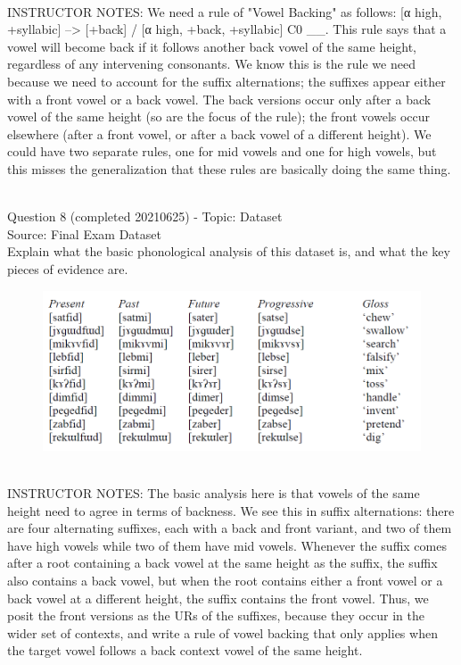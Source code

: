 \documentclass[12pt]{article}
\begin{document}
~\\
INSTRUCTOR NOTES: We need a rule of "Vowel Backing" as follows: [α high, +syllabic] --> [+back] / [α high, +back, +syllabic] C0 \_\_. This rule says that a vowel will become back if it follows another back vowel of the same height, regardless of any intervening consonants. We know this is the rule we need because we need to account for the suffix alternations; the suffixes appear either with a front vowel or a back vowel. The back versions occur only after a back vowel of the same height (so are the focus of the rule); the front vowels occur elsewhere (after a front vowel, or after a back vowel of a different height). We could have two separate rules, one for mid vowels and one for high vowels, but this misses the generalization that these rules are basically doing the same thing.


~\\

{\large Question 8} (completed 20210625) - Topic: Dataset\\
Source: Final Exam Dataset\\

Explain what the basic phonological analysis of this dataset is, and what the key pieces of evidence are.\\

\begin{figure}[H]
\includegraphics{../images/final_dataset.png}
\end{figure}

~\\
INSTRUCTOR NOTES: The basic analysis here is that vowels of the same height need to agree in terms of backness. We see this in suffix alternations: there are four alternating suffixes, each with a back and front variant, and two of them have high vowels while two of them have mid vowels. Whenever the suffix comes after a root containing a back vowel at the same height as the suffix, the suffix also contains a back vowel, but when the root contains either a front vowel or a back vowel at a different height, the suffix contains the front vowel. Thus, we posit the front versions as the URs of the suffixes, because they occur in the wider set of contexts, and write a rule of vowel backing that only applies when the target vowel follows a back context vowel of the same height.
\end{document}

